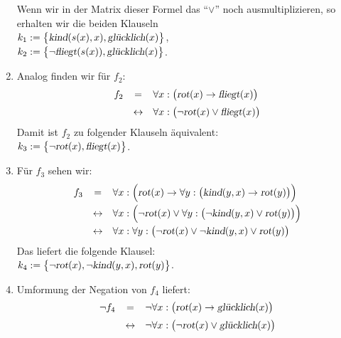\begin{enumerate}
      Wenn wir in der Matrix dieser Formel das ``$\vee$'' noch ausmultiplizieren, so
      erhalten wir die beiden Klauseln 
      \\[0.2cm]
      \hspace*{1.3cm} $k_1 := \bigl\{ \textsl{kind}(s(x),x), \textsl{glücklich}(x) \bigl\}$,   \\[0.2cm]
      \hspace*{1.3cm} $k_2 := \bigl\{ \neg \textsl{fliegt}(s(x)), \textsl{glücklich}(x) \bigl\}$. 
\item Analog finden wir für $f_2$:
 $$
        \begin{array}{lcl}
            f_2 & =  & \forall x: \bigl(\textsl{rot}(x) \rightarrow \textsl{fliegt}(x) \bigr) \\[0.2cm]
            & \leftrightarrow  & \forall x: \bigl(\neg \textsl{rot}(x) \vee \textsl{fliegt}(x) \bigr)
        \end{array}
      $$ 
      Damit ist $f_2$ zu folgender Klauseln äquivalent: \\[0.2cm]
      \hspace*{1.3cm} $k_3 := \bigl\{ \neg \textsl{rot}(x), \textsl{fliegt}(x) \bigl\}$.
\item Für $f_3$ sehen wir:
 $$
        \begin{array}{lcl}
          f_3 & =          & \forall x: \Bigl(\textsl{rot}(x) \rightarrow 
                             \forall y: \bigl(\textsl{kind}(y,x) \rightarrow \textsl{rot}(y)\bigr) \Bigr) 
          \\[0.2cm]
          &\leftrightarrow & \forall x: \Bigl(\neg \textsl{rot}(x) \vee 
                             \forall y: \bigl(\neg \textsl{kind}(y,x) \vee \textsl{rot}(y)\bigr)\Bigr) 
          \\[0.2cm]
          &\leftrightarrow & \forall x: \forall y: \bigl(\neg \textsl{rot}(x) \vee \neg \textsl{kind}(y,x) \vee \textsl{rot}(y)\bigr)
        \end{array}
      $$
     Das liefert die folgende Klausel: \\[0.2cm]
     \hspace*{1.3cm} $ k_4 := \bigl\{ \neg \textsl{rot}(x), \neg \textsl{kind}(y,x), \textsl{rot}(y)\bigl\}$.
\item Umformung der Negation von $f_4$ liefert:
 $$
        \begin{array}{lcl}
\neg f_4 & =      & \neg \forall x: \bigl(\textsl{rot}(x) \rightarrow \textsl{glücklich}(x)\bigr) 
         \\[0.2cm]
         & \leftrightarrow & \neg \forall x: \bigl(\neg \textsl{rot}(x) \vee \textsl{glücklich}(x) \bigr)

\end{array}$$
\end{enumerate}
